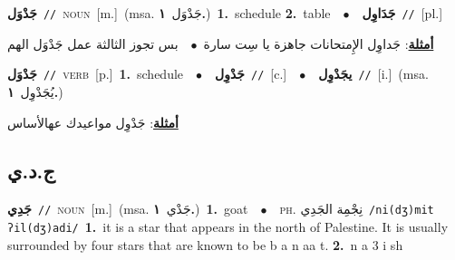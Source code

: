 \documentclass[10pt,a4paper,twoside]{article} %
\begin{document}
\begin{multicols}{2}
{\setlength\topsep{0pt}\textbf{\foreignlanguage{arabic}{جَدْوَل}}\ {\color{gray}\texttt{//}\color{black}}\ \textsc{noun}\ [m.]\ \color{gray}(msa. \foreignlanguage{arabic}{جَدْوَل}~\foreignlanguage{arabic}{\textbf{١.}})\color{black}\ \textbf{1.}~schedule  \textbf{2.}~table\ \ $\bullet$\ \ \setlength\topsep{0pt}\textbf{\foreignlanguage{arabic}{جَدَاوِل}}\ {\color{gray}\texttt{//}\color{black}}\ [pl.]\  \begin{flushright}\color{gray}\foreignlanguage{arabic}{\textbf{\underline{\foreignlanguage{arabic}{أمثلة}}}: جَداوِل الإِمتحانات جاهزة يا سِت سارة\ $\bullet$\ \  بس تجوز الثالثة عمل جَدْوَل الهم}\end{flushright}\color{black}} \vspace{2mm}

{\setlength\topsep{0pt}\textbf{\foreignlanguage{arabic}{جَدْوَل}}\ {\color{gray}\texttt{//}\color{black}}\ \textsc{verb}\ [p.]\ \textbf{1.}~schedule\ \ $\bullet$\ \ \setlength\topsep{0pt}\textbf{\foreignlanguage{arabic}{جَدْوِل}}\ {\color{gray}\texttt{//}\color{black}}\ [c.]\ \ $\bullet$\ \ \setlength\topsep{0pt}\textbf{\foreignlanguage{arabic}{يجَدْوِل}}\ {\color{gray}\texttt{//}\color{black}}\ [i.]\ \color{gray}(msa. \foreignlanguage{arabic}{يُجَدْوِل}~\foreignlanguage{arabic}{\textbf{١.}})\color{black}\  \begin{flushright}\color{gray}\foreignlanguage{arabic}{\textbf{\underline{\foreignlanguage{arabic}{أمثلة}}}: جَدْوِل مواعيدك عهالأساس}\end{flushright}\color{black}} \vspace{2mm}

\vspace{-3mm}
\subsection*{\color{blue}\foreignlanguage{arabic}{ج.د.ي}\color{blue}{}} 

{\setlength\topsep{0pt}\textbf{\foreignlanguage{arabic}{جَدِي}}\ {\color{gray}\texttt{//}\color{black}}\ \textsc{noun}\ [m.]\ \color{gray}(msa. \foreignlanguage{arabic}{جَدْي}~\foreignlanguage{arabic}{\textbf{١.}})\color{black}\ \textbf{1.}~goat\ \ $\bullet$\ \ \textsc{ph.} \color{gray} \foreignlanguage{arabic}{نِجْمِة الجَدِي}\color{black}\ {\color{gray}\texttt{/{\sffamily ni(dʒ)mit ʔil(dʒ)adi}/}\color{black}}\ \textbf{1.}~it is a star that appears in the north of Palestine. It is usually surrounded by four stars that are known to be b a n aa t.  \textbf{2.}~n a 3 i sh\ } \vspace{2mm}


\end{multicols}
\end{document}
